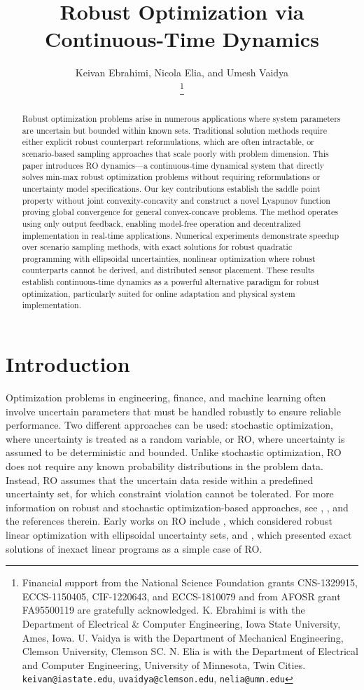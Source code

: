 \documentclass[journal,twoside,web]{ieeecolor}
\title{\LARGE \bf Robust Optimization via Continuous-Time Dynamics}
\author{Keivan Ebrahimi, Nicola Elia, and Umesh Vaidya\\
\thanks{Financial support from the National Science Foundation grants CNS-1329915, ECCS-1150405, CIF-1220643, and ECCS-1810079 and from AFOSR grant FA95500119 are gratefully acknowledged. K. Ebrahimi is with the Department of Electrical \& Computer Engineering, Iowa State University, Ames, Iowa. U. Vaidya is with the Department of Mechanical Engineering, Clemson University, Clemson SC.  N. Elia is with the Department of Electrical and Computer Engineering, University of Minnesota, Twin Cities.
{\tt\small keivan@iastate.edu},
{\tt\small uvaidya@clemson.edu},
{\tt\small nelia@umn.edu}
}}
\newcommand{\rev}[1]{\textcolor{revisionblue}{#1}}
\begin{document}
\pagestyle{headings}
\setcounter{page}{1}

\maketitle

\begin{abstract}
\rev{Robust optimization problems arise in numerous applications where system parameters are uncertain but bounded within known sets. Traditional solution methods require either explicit robust counterpart reformulations, which are often intractable, or scenario-based sampling approaches that scale poorly with problem dimension. This paper introduces RO dynamics—a continuous-time dynamical system that directly solves min-max robust optimization problems without requiring reformulations or uncertainty model specifications. Our key contributions establish the saddle point property without joint convexity-concavity and construct a novel Lyapunov function proving global convergence for general convex-concave problems. The method operates using only output feedback, enabling model-free operation and decentralized implementation in real-time applications. Numerical experiments demonstrate speedup over scenario sampling methods, with exact solutions for robust quadratic programming with ellipsoidal uncertainties, nonlinear optimization where robust counterparts cannot be derived, and distributed sensor placement. These results establish continuous-time dynamics as a powerful alternative paradigm for robust optimization, particularly suited for online adaptation and physical system implementation.}
\end{abstract}

\section{Introduction}

\rev{Optimization problems in engineering, finance, and machine learning often involve uncertain parameters that must be handled robustly to ensure reliable performance.} Two different approaches can be used: stochastic optimization, where uncertainty is treated as a random variable, or RO, where uncertainty is assumed to be deterministic and bounded. Unlike stochastic optimization, RO does not require any known probability distributions in the problem data. Instead, RO assumes that the uncertain data reside within a predefined uncertainty set, for which constraint violation cannot be tolerated. For more information on robust and stochastic optimization-based approaches, see \cite{bental2009}, \cite{bertsimas2011}, and the references therein. Early works on RO include \cite{soyster1976}, which considered robust linear optimization with ellipsoidal uncertainty sets, and \cite{falk1976}, which presented exact solutions of inexact linear programs as a simple case of RO.
\end{document}
